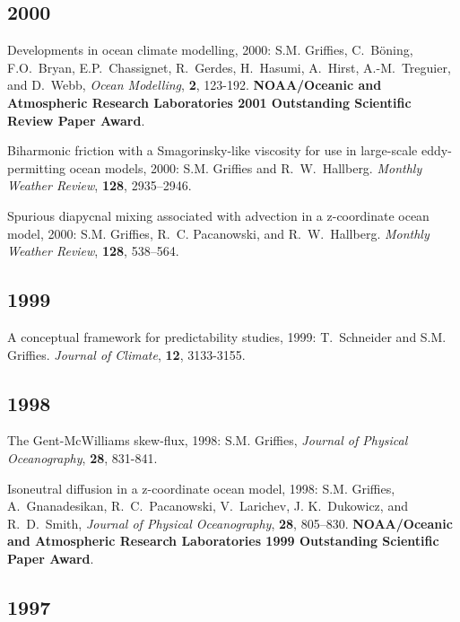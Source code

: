 \begin{etaremune}
\subsection*{\sc \color{Maroon} 2000}

\item Developments in ocean climate modelling, 2000:  S.M. Grif\/f\/ies, C.\ B\"oning, F.O.\ Bryan, E.P.\ Chassignet, R.\  Gerdes, H.\ Hasumi, A.\ Hirst, A.-M.\ Treguier, and D.\ Webb, {\em Ocean Modelling}, {\bf 2}, 123-192.  {\bf NOAA/Oceanic and Atmospheric Research Laboratories 2001 Outstanding Scientific Review Paper Award}.

\item Biharmonic friction with a  Smagorinsky-like viscosity for use in large-scale eddy-permitting ocean models, 2000: S.M. Grif\/f\/ies and R.\ W.\ Hallberg.  {\em Monthly Weather Review}, {\bf 128}, 2935--2946.

\item Spurious diapycnal mixing associated with advection in a z-coordinate ocean model, 2000: S.M. Grif\/f\/ies, R.\ C. Pacanowski, and R.\ W.\ Hallberg. {\em Monthly Weather Review}, {\bf 128}, 538--564.

\subsection*{\sc \color{Maroon} 1999}

\item A conceptual framework for predictability studies, 1999: T.\  Schneider and S.M. Grif\/f\/ies.  {\em Journal of Climate}, {\bf 12}, 3133-3155.

\subsection*{\sc \color{Maroon} 1998}
  
\item The Gent-McWilliams skew-flux, 1998: S.M. Grif\/f\/ies, {\em Journal of Physical Oceanography}, {\bf 28}, 831-841.
  
\item Isoneutral diffusion in a z-coordinate ocean model, 1998: S.M. Grif\/f\/ies, A.\ Gnanadesikan, R.\ C.\ Pacanowski, V.\ Larichev, J. K.\ Dukowicz, and R.\ D.\ Smith, {\em Journal of  Physical Oceanography}, {\bf 28}, 805--830.  {\bf NOAA/Oceanic and Atmospheric Research Laboratories 1999 Outstanding Scientific Paper Award}.

\subsection*{\sc \color{Maroon} 1997}
  

\end{etaremune}
